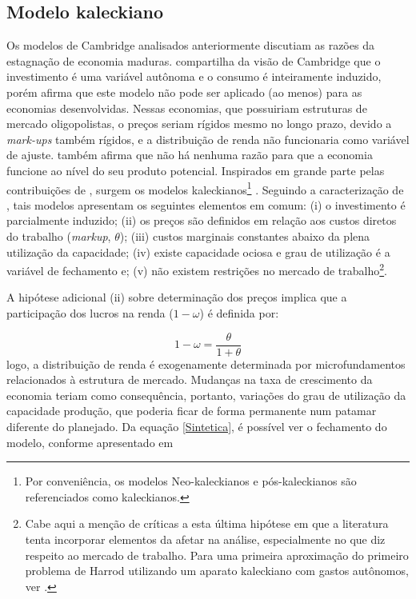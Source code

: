 \subsection{Modelo kaleckiano}


Os modelos de Cambridge analisados anteriormente discutiam as razões da estagnação de economia maduras. \textcite{steindl_stagnation_1979} compartilha da visão de Cambridge que o investimento é uma variável autônoma e o consumo é inteiramente induzido, porém afirma que este modelo não pode ser aplicado (ao menos) para as economias desenvolvidas. Nessas economias, que possuiriam estruturas de mercado oligopolistas, o preços seriam rígidos mesmo no longo prazo, devido a \textit{mark-ups} também rígidos, e a distribuição de renda não funcionaria como variável de ajuste. \citeauthor{steindl_stagnation_1979} também afirma que não há nenhuma razão para que a economia funcione ao nível do seu produto potencial. 
Inspirados em grande parte pelas contribuições de \textcite{steindl_stagnation_1979}, surgem os modelos kaleckianos\footnote{Por conveniência, os modelos Neo-kaleckianos e pós-kaleckianos são referenciados como kaleckianos.} \cites{rowthorn_demand_1981}{dutt_stagnation_1984}{taylor_stagnationist_1985}{amadeo_role_1986}{bhaduri_unemployment_1990}. Seguindo a caracterização de \textcite[p.~790]{lavoie_kaleckian_1995}, tais modelos apresentam os seguintes elementos em comum: (i) o investimento é parcialmente induzido; (ii) os preços são definidos em relação aos custos diretos do trabalho (\textit{markup}, $\theta$); (iii) custos marginais constantes abaixo da plena utilização da capacidade; (iv) existe capacidade ociosa e grau de utilização é a variável de fechamento e; (v) não existem restrições no mercado de trabalho\footnote{Cabe aqui a menção de críticas a esta última hipótese em que a literatura tenta incorporar elementos da afetar na análise, especialmente no que diz respeito ao mercado de trabalho. Para uma primeira aproximação do primeiro problema de Harrod utilizando um aparato kaleckiano com gastos autônomos, ver \textcite{allain_demographic_2018}.}. 

A hipótese adicional (ii) sobre determinação dos preços implica que a participação dos lucros na renda ($1-\omega$) é definida por:

$$
1- \omega = \frac{\theta}{1+\theta}
$$
logo, a distribuição de renda é exogenamente determinada por microfundamentos relacionados à estrutura de mercado. 
Mudanças na taxa de crescimento da economia teriam como consequência, portanto, variações do grau de utilização da capacidade produção, que poderia ficar de forma permanente num patamar diferente do planejado. Da equação \ref{Sintetica}, é possível ver o fechamento do modelo, conforme apresentado em \textcite{serrano_har_2018}

